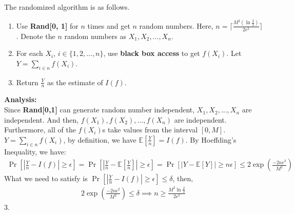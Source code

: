 The randomized algorithm is as follows.
\begin{enumerate}
    \item Use \textbf{Rand[0, 1]} for $n$ times and get $n$ random numbers.
    Here, $n=\lceil \frac{M^2(\ln \frac{2}{\delta})}{2\epsilon^2}\rceil $.
    Denote the $n$ random numbers as $X_1, X_2, ..., X_{n}$.
    \item For each $X_i$, $i\in \{1,2,...,n\}$, use \textbf{black box access} to get $f(X_i)$.
    Let $Y=\sum_{i\in n}f(X_i)$.
    \item Return $\frac{Y}{n}$ as the estimate of $I(f)$.
\end{enumerate}
\textbf{Analysis:}\\
Since \textbf{Rand[0,1]} can generate random number independent,
$X_1, X_2,..., X_{n}$ are independent.
And then, $f(X_1), f(X_2),..., f(X_{n})$ are independent.
Furthermore, all of the $f(X_i)$s take values from the interval $[0, M]$.
$Y=\sum_{i\in n}f(X_i)$, by definition, we have $\mathbb{E}[\frac{Y}{n}]=I(f)$.
By Hoeffding's Inequality, we have:
\begin{align}
    \nonumber \Pr[|\frac{Y}{n}-I(f)|\ge\epsilon]=\Pr[|\frac{Y}{n}-\mathbb{E}[\frac{Y}{n}]|\ge\epsilon]
    =\Pr[|Y-\mathbb{E}[Y]|\ge n\epsilon]\le 2\exp({\frac{-2n\epsilon^2}{M^2}})
\end{align}
What we need to satisfy is $\Pr[|\frac{Y}{n}-I(f)|\ge\epsilon]\le \delta$, then,
\begin{align}
    \nonumber 2\exp({\frac{-2n\epsilon^2}{M^2}}) \le \delta \implies n\ge \frac{M^2\ln \frac{2}{\delta}}{2\epsilon^2}
\end{align}
3.
